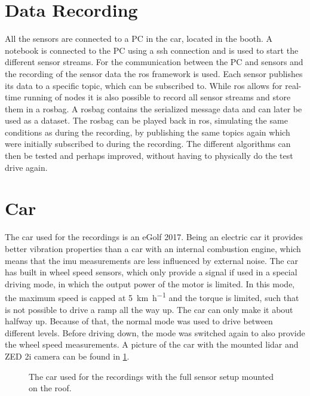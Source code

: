 \section{Data Recording}
All the sensors are connected to a PC in the car, located in the booth.
A notebook is connected to the PC using a \gls{ssh} connection and is used to start the different sensor streams.
For the communication between the PC and sensors and the recording of the sensor data the \gls{ros} framework is used.
Each sensor publishes its data to a specific topic, which can be subscribed to.
While \gls{ros} allows for real-time running of nodes it is also possible to record all sensor streams and store them in a rosbag.
A rosbag contains the serialized message data and can later be used as a dataset.
The rosbag can be played back in \gls{ros}, simulating the same conditions as during the recording, by publishing the same topics again which were initially subscribed to during the recording.
The different algorithms can then be tested and perhaps improved, without having to physically do the test drive again.



\section{Car}
\label{sec:car}
The car used for the recordings is an eGolf 2017.
Being an electric car it provides better vibration properties than a car with an internal combustion engine, which means that the \gls{imu} measurements are less influenced by external noise.
The car has built in wheel speed sensors, which only provide a signal if used in a special driving mode, in which the output power of the motor is limited.
In this mode, the maximum speed is capped at \SI{5}{\kilo\metre\per\hour} and the torque is limited, such that is not possible to drive a ramp all the way up.
The car can only make it about halfway up.
Because of that, the normal mode was used to drive between different levels.
Before driving down, the mode was switched again to also provide the wheel speed measurements.
A picture of the car with the mounted \gls{lidar} and ZED 2i camera can be found in \cref{fig:eGolf}.
\begin{figure}[htb]
    \centering
    
    \caption[Car with mounted sensors]{The car used for the recordings with the full sensor setup mounted on the roof.}
    \label{fig:eGolf}
\end{figure}



